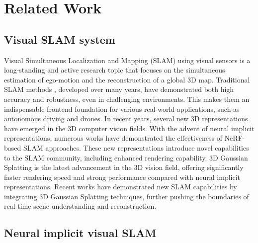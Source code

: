 \section{Related Work}
\subsection{Visual SLAM system}

    Visual Simultaneous Localization and Mapping (SLAM) using visual sensors is a long-standing and active research topic that focuses on the simultaneous estimation of ego-motion and the reconstruction of a global 3D map. 
    Traditional SLAM methods \cite{mur2015orb, mur2017orb, campos2021orb, engel2017direct}, developed over many years, have demonstrated both high accuracy and robustness, even in challenging environments. This makes them an indispensable frontend foundation for various real-world applications, such as autonomous driving and drones.
    In recent years, several new 3D representations have emerged in the 3D computer vision fields. With the advent of neural implicit representations, numerous works \cite{sucar2021imap, zhu2022nice, zhu2024nicer, johari2023eslam} have demonstrated the effectiveness of NeRF-based SLAM approaches. These new representations introduce novel capabilities to the SLAM community, including enhanced rendering capability. %
    3D Gaussian Splatting is the latest advancement in the 3D vision field, offering significantly faster rendering speed and strong performance compared with neural implicit representations. Recent works \cite{keetha2023splatam, matsuki2024gaussian, yugay2023gaussian, huang2024photo} have demonstrated new SLAM capabilities by integrating 3D Gaussian Splatting techniques, further pushing the boundaries of real-time scene understanding and reconstruction.

\subsection{Neural implicit visual SLAM}

